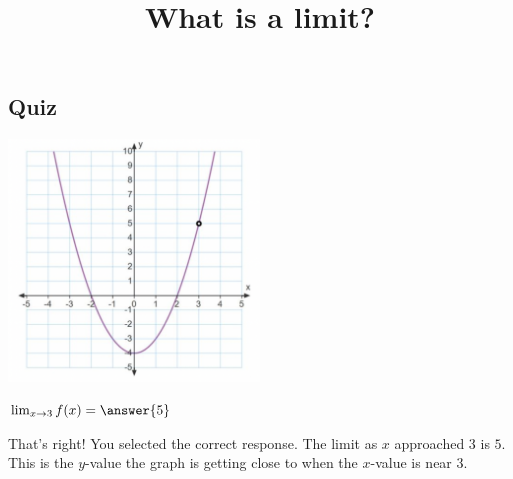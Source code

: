 \documentclass{ximera}
\title{What is a limit?}
\begin{document}
\begin{abstract}
\end{abstract}

\subsection{Quiz}

\includegraphics[width=0.5\textwidth]{graph1.png}
\begin{question}  
$\lim_{x \to 3} f(x) = \answer{5}$  

\begin{explanation}
    That's right! You selected the correct response. The limit as $x$ approached $3$ is $5$. This is the $y$-value the graph is getting close to when the $x$-value is near $3$.
\end{explanation}
\end{question}
\end{document}
